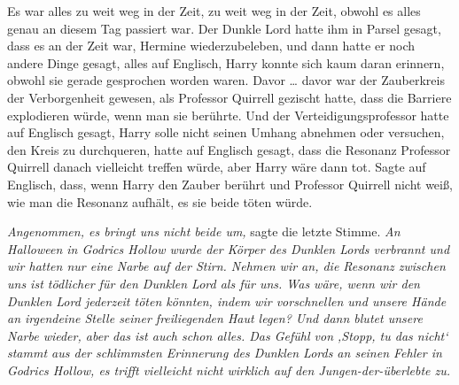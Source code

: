 Es war alles zu weit weg in der Zeit, zu weit weg in der Zeit, obwohl es alles genau an diesem Tag passiert war. Der Dunkle Lord hatte ihm in Parsel gesagt, dass es an der Zeit war, Hermine wiederzubeleben, und dann hatte er noch andere Dinge gesagt, alles auf Englisch, Harry konnte sich kaum daran erinnern, obwohl sie gerade gesprochen worden waren. Davor … davor war der Zauberkreis der Verborgenheit gewesen, als Professor Quirrell gezischt hatte, dass die Barriere explodieren würde, wenn man sie berührte. Und der Verteidigungsprofessor hatte auf Englisch gesagt, Harry solle nicht seinen Umhang abnehmen oder versuchen, den Kreis zu durchqueren, hatte auf Englisch gesagt, dass die Resonanz Professor Quirrell danach vielleicht treffen würde, aber Harry wäre dann tot. Sagte auf Englisch, dass, wenn Harry den Zauber berührt und Professor Quirrell nicht weiß, wie man die Resonanz aufhält, es sie beide töten würde.

\emph{Angenommen, es bringt uns nicht beide um,} sagte die letzte Stimme. \emph{An Halloween in Godrics Hollow wurde der Körper des Dunklen Lords verbrannt und wir hatten nur eine Narbe auf der Stirn. Nehmen wir an, die Resonanz zwischen uns ist tödlicher für den Dunklen Lord als für uns. Was wäre, wenn wir den Dunklen Lord jederzeit töten könnten, indem wir vorschnellen und unsere Hände an irgendeine Stelle seiner freiliegenden Haut legen? Und dann blutet unsere Narbe wieder, aber das ist auch schon alles. Das Gefühl von ‚Stopp, tu das nicht‘ stammt aus der schlimmsten Erinnerung des Dunklen Lords an seinen Fehler in Godrics Hollow, es trifft vielleicht nicht wirklich auf den Jungen-der-überlebte zu.}

